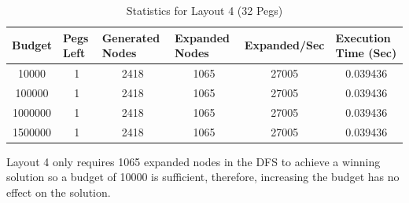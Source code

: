 \documentclass[12pt,a4paper]{article}
\begin{document}
\begin{table}[H]
\caption{Statistics for Layout 4 (32 Pegs)}
\label{tab:my-table}

\begin{tabular}{|c|c|c|c|c|c|}
\hline
Budget  & \multicolumn{1}{l|}{Pegs Left} & \multicolumn{1}{l|}{Generated Nodes} & \multicolumn{1}{l|}{Expanded Nodes} & \multicolumn{1}{l|}{Expanded/Sec} & \multicolumn{1}{l|}{Execution Time (Sec)} \\ \hline
10000   & 1                              & 2418                                 & 1065                                & 27005                                & 0.039436                                              \\ \hline
100000  & 1                              & 2418                                 & 1065                                & 27005                                & 0.039436                                              \\ \hline
1000000 & 1                              & 2418                                 & 1065                                & 27005                                & 0.039436                                              \\ \hline
1500000 & 1                              & 2418                                 & 1065                                & 27005                                & 0.039436                                              \\ \hline
\end{tabular}
\end{table}
Layout 4 only requires 1065 expanded nodes in the DFS to achieve a winning solution so a budget of 10000 is sufficient, therefore, increasing the budget has no effect on the solution.\\
\end{document}
